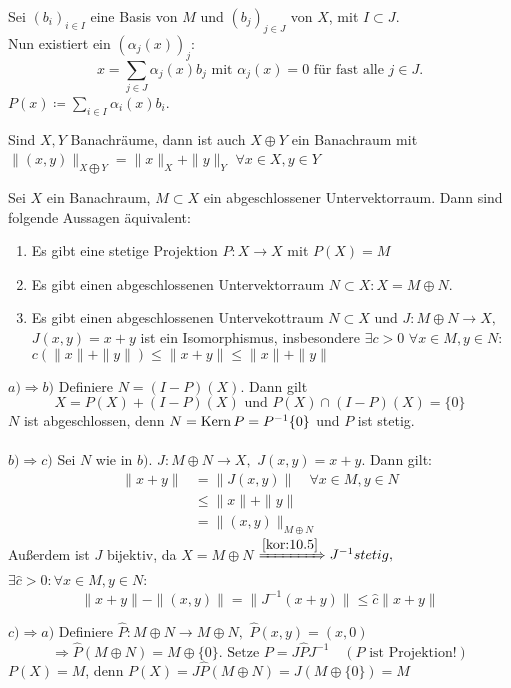 \begin{beweis}
	Sei $(b_{i})_{i \in I}$ eine Basis von $M$ und $(b_{j})_{j \in J}$ von $X$, mit $I \subset J$. \\
	Nun existiert ein $(\alpha_{j}(x))_{j}$:
	\[ x = \sum_{j \in J} \alpha_{j}(x) b_{j} \text{ mit } \alpha_{j}(x) = 0 \text{ für fast alle } j \in J. \]
	$P(x) \coloneqq \sum_{i \in I} \alpha_{i}(x) b_{i}$.
\end{beweis}


\begin{erinnerung}
	Sind $X, Y$ Banachräume, dann ist auch $X \oplus Y$ ein Banachraum mit $\| (x, y) \|_{X \bigoplus Y} = \| x \|_{X} + \| y \|_{Y}$ $\forall x \in X, y \in Y$
\end{erinnerung}

\begin{satz} \label{satz:11.4}
	Sei $X$ ein Banachraum, $M \subset X$ ein abgeschlossener Untervektorraum. Dann sind folgende Aussagen äquivalent:
	\begin{enumerate}[label=\alph*\upshape)]
		\item Es gibt eine stetige Projektion $P \colon X \rightarrow X$ mit $P(X) = M$
		\item Es gibt einen abgeschlossenen Untervektorraum $N \subset X: X = M \oplus N$.
		\item Es gibt einen abgeschlossenen Untervekottraum $N \subset X$ und $J: M \oplus N \rightarrow X,$ $J(x, y) = x + y$ ist ein Isomorphismus, insbesondere $\exists c > 0$ $\forall x \in M, y \in N:$ $c \left( \|x \| + \|y \| \right) \leq \|x + y \| \leq \|x \| + \| y \| $
	\end{enumerate}
\end{satz}

\begin{beweis}
	$a) \Rightarrow b)$ Definiere $N = (I - P)(X)$. Dann gilt
		\[ X = P(X) + (I - P)(X) \text{ und } P(X) \cap (I - P)(X) = \{ 0 \} \]
		$N$ ist abgeschlossen, denn $N = \mathop{\rm Kern}\nolimits{P} = P^{-1}\{ 0 \}$ und $P$ ist stetig.	\\ \\
	$b) \Rightarrow c)$ Sei $N$ wie in $b)$. $J: M \oplus N \rightarrow X,$ $J(x, y) = x + y$. Dann gilt:
		\begin{align*}
			\| x + y \| & = \| J(x, y) \| \quad \forall x \in M, y \in N \\
						& \leq \| x \| + \| y \| \\
						& = \| (x, y) \|_{M \oplus N}
		\end{align*}
		Au{\ss}erdem ist $J$ bijektiv, da $X = M \oplus N$
		$\xRightarrow[]{\ref{kor:10.5}} J^{-1} stetig,$ $\exists \hat{c} > 0: \forall x \in M, y \in N$:
		\[ \| x + y \| - \| (x, y) \| = \| J^{-1}(x + y) \| \leq \hat{c} \| x + y \| \]

	$c) \Rightarrow a)$ Definiere $\hat{P} \colon M \oplus N \rightarrow M \oplus N,$ $\hat{P}(x, y) = (x, 0)$
		\[ \Rightarrow \hat{P}(M \oplus N) = M \oplus \{ 0 \}. \text{ Setze } P = J \hat{P} J^{-1} \quad (P \text{ ist Projektion!}) \]
		$P(X) = M$, denn $P(X) = J \hat{P}(M \oplus N) = J (M \oplus \{ 0 \}) = M$
\end{beweis}


